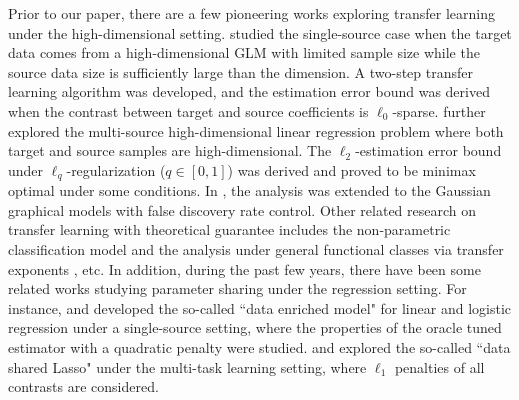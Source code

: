 \documentclass[12pt]{article}
\newcommand{\<}{\langle}
\renewcommand{\>}{\rangle}
\begin{document}
Prior to our paper, there are a few pioneering works exploring transfer learning under the high-dimensional setting. \cite{bastani2021predicting} studied the single-source case when the target data comes from a high-dimensional GLM with limited sample size while the source data size is sufficiently large than the dimension. A two-step transfer learning algorithm was developed, and the estimation error bound was derived when the contrast between target and source coefficients is $\ell_0$-sparse. \cite{li2021transfer} further explored the multi-source high-dimensional linear regression problem where both target and source samples are high-dimensional. The $\ell_2$-estimation error bound under $\ell_q$-regularization ($q \in [0, 1]$) was derived and proved to be minimax optimal under some conditions. In \cite{li2020transfer2}, the analysis was extended to the Gaussian graphical models  with false discovery rate control. Other related research on transfer learning with theoretical guarantee includes the non-parametric classification model \citep{cai2021transfer, reeve2021adaptive} and the analysis under general functional classes via  transfer exponents \citep{hanneke2020no, hanneke2020value}, etc. In addition, during the past few years, there have been some related works studying parameter sharing under the regression setting. For instance, \cite{chen2015data} and \cite{zheng2019data} developed the so-called ``data enriched model" for linear and logistic regression under a single-source setting, where the properties of the oracle tuned estimator with a quadratic penalty were studied. \cite{gross2016data} and \cite{ollier2017regression} explored the so-called ``data shared Lasso" under the multi-task learning setting, where $\ell_1$ penalties of all contrasts are considered.
\end{document}
